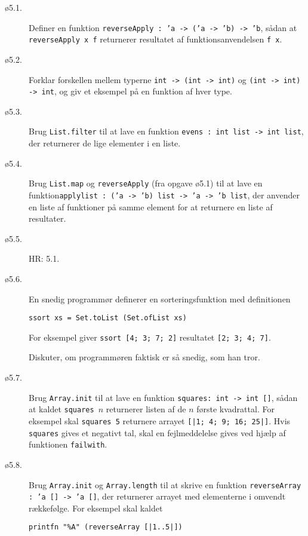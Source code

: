 \documentclass[a4paper]{article}
\begin{document}
\begin{description}
\item[ø5.1.] Definer en funktion \texttt{reverseApply : 'a -> ('a ->
  'b) -> 'b}, sådan at \texttt{reverseApply x f} returnerer resultatet
  af funktionsanvendelsen \texttt{f x}.

\item[ø5.2.]  Forklar forskellen mellem typerne \texttt{int -> (int ->
  int)} og \texttt{(int -> int) -> int}, og giv et eksempel på en
  funktion af hver type.

\item[ø5.3.] Brug \texttt{List.filter} til at lave en funktion
  \texttt{evens : int list -> int list}, der returnerer de lige
  elementer i en liste.

\item[ø5.4.] Brug \texttt{List.map} og \texttt{reverseApply} (fra
  opgave ø5.1) til at lave en funktion\newline \texttt{applylist : ('a -> 'b)
    list -> 'a -> 'b list}, der anvender en liste af funktioner på
  samme element for at returnere en liste af resultater.

\item[ø5.5.] HR: 5.1.

\item[ø5.6.] En snedig programmør definerer en sorteringsfunktion med
  definitionen

\texttt{ssort xs = Set.toList (Set.ofList xs)}

For eksempel giver \texttt{ssort [4; 3; 7; 2]} resultatet \texttt{[2;
    3; 4; 7]}.

Diskuter, om programmøren faktisk er så snedig, som han tror.

\item[ø5.7.] Brug \texttt{Array.init} til at lave en funktion
  \texttt{squares: int -> int []}, sådan at kaldet
  \texttt{squares~$n$} returnerer listen af de $n$ første kvadrattal.
  For eksempel skal \texttt{squares~5} returnere arrayet \texttt{[|1;
      4; 9; 16; 25|]}.  Hvis \texttt{squares} gives et negativt tal,
  skal en fejlmeddelelse gives ved hjælp af funktionen
  \texttt{failwith}.

\item[ø5.8.] Brug \texttt{Array.init} og \texttt{Array.length} til at
  skrive en funktion \texttt{reverseArray : 'a [] -> 'a []}, der
  returnerer arrayet med elementerne i omvendt rækkefølge.  For
  eksempel skal kaldet

\begin{verbatim}
printfn "%A" (reverseArray [|1..5|])
\end{verbatim}


\end{description}
\end{document}
